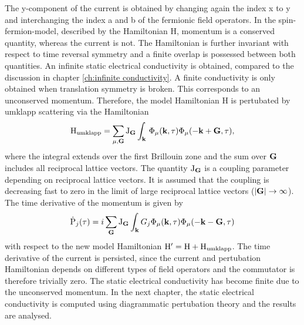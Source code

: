 %
The y-component of the current is obtained by changing again the index x to y and interchanging the index a and b of the fermionic field operators.
In the spin-fermion-model, described by the Hamiltonian H, momentum is a conserved quantity, whereas the current is not.
The Hamiltonian is further invariant with respect to time reversal symmetry and a finite overlap is possessed between both quantities.
An infinite static electrical conductivity is obtained, compared to the discussion in chapter \ref{ch:infinite conductivity}.
A finite conductivity is only obtained when translation symmetry is broken.
This corresponds to an unconserved momentum.
Therefore, the model Hamiltonian H is pertubated by umklapp scattering via the Hamiltonian
%
\begin{align}
	\mathrm{H}_{\mathrm{umklapp}} = \sum\limits_{\mu, \vb{G}} \mathrm{J}_{\vb{G}}
		\int_{\vb{k}}\, \Phi_{\mu}(\vb{k},\tau) \Phi_{\mu}(-\vb{k}+\vb{G},\tau),
	\label{eq:Hamiltonian umklapp scattering}
\end{align}
%
where the integral extends over the first Brillouin zone and the sum over $\vb{G}$ includes all reciprocal lattice vectors.
The quantity $\mathrm{J}_{\vb{G}}$ is a coupling parameter depending on reciprocal lattice vectors.
It is assumed that the coupling is decreasing fast to zero in the limit of large reciprocal lattice vectors ($|\vb{G}| \to \infty$).
The time derivative of the momentum is given by
%
\begin{align}
	\dot{\mathrm{P}}_{j}(\tau) = i \sum\limits_{\vb{G}} \mathrm{J}_{\vb{G}} \int_{\vb{k}} G_{j} \Phi_{\mu}(\vb{k},\tau) \Phi_{\mu}(-\vb{k} - \vb{G},\tau)
	\label{eq:time derivative momentum finite}
\end{align}
%
with respect to the new model Hamiltonian $\mathrm{H}' = \mathrm{H} + \mathrm{H}_{\mathrm{umklapp}}$.
The time derivative of the current is persisted, since the current and pertubation Hamiltonian depends on different types of field operators and the commutator is therefore trivially zero.
The static electrical conductivity has become finite due to the unconserved momentum.
In the next chapter, the static electrical conductivity is computed using diagrammatic pertubation theory and the results are analysed.
